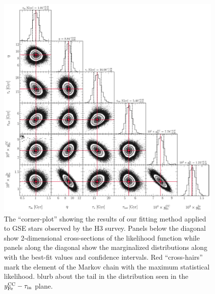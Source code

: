 \documentclass[ms.tex]{subfiles}
\begin{document}
\begin{figure}
\centering
\includegraphics[scale = 0.5]{gsechem_512k.pdf}
\caption{
The ``corner-plot'' showing the results of our fitting method applied to GSE
stars observed by the H3 survey.
Panels below the diagonal show 2-dimensional cross-sections of the likelihood
function while panels along the diagonal show the marginalized distributions
along with the best-fit values and confidence intervals.
Red ``cross-hairs'' mark the element of the Markov chain with the maximum
statistical likelihood.
{\color{red} blurb about the tail in the distribution seen in the
$y_\text{Fe}^\text{CC} - \tau_\text{in}$ plane.}
}
\label{fig:gse_corner}
\end{figure}
\end{document}
